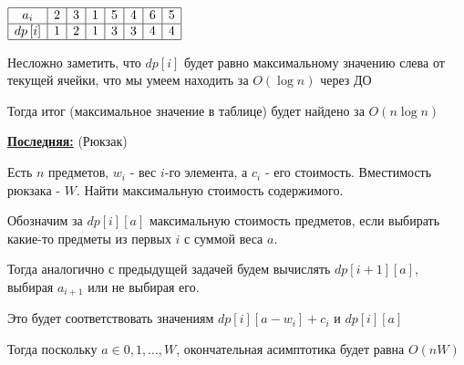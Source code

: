 \text{}

$\begin{array}{|c|c|c|c|c|c|c|c|}
\hline
     a_i & 2 & 3 & 1 & 5 & 4 & 6 & 5  \\
\hline
     dp\left[i\right] & 1 & 2 & 1 & 3 & 3 & 4 & 4\\
    \hline
\end{array}$

\text{}

Несложно заметить, что $dp\left[i\right]$ будет равно максимальному значению слева от текущей ячейки, что мы умеем находить за $O(\log{n})$ через ДО

Тогда итог (максимальное значение в таблице) будет найдено за $O(n \log{n})$

\underline{\textbf{Последняя:}} (Рюкзак)

Есть $n$ предметов, $w_i$ - вес $i$-го элемента, а $c_i$ - его стоимость. Вместимость рюкзака - $W$. Найти максимальную стоимость содержимого.

Обозначим за $dp\left[i\right]\left[a\right]$ максимальную стоимость предметов, если выбирать какие-то предметы из первых $i$ с суммой веса $a$.

Тогда аналогично с предыдущей задачей будем вычислять $dp\left[i+1\right]\left[a\right]$, выбирая $a_{i + 1}$ или не выбирая его.

Это будет соответствовать значениям $dp\left[i\right]\left[a - w_i\right] + c_i$ и $dp\left[i\right]\left[a\right]$

Тогда поскольку $a \in {0, 1, \dots, W}$, окончательная асимптотика будет равна $O(nW)$
